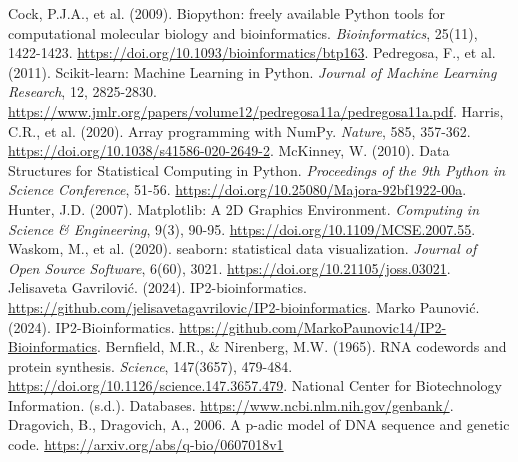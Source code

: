 \documentclass[a4paper,12pt]{article}
\begin{document}
\newpage
{}
\renewcommand{\refname}{Reference}
\begin{thebibliography}{9}
     Cock, P.J.A., et al. (2009). Biopython: freely available Python tools for computational molecular biology and bioinformatics. \textit{Bioinformatics}, 25(11), 1422-1423. \url{https://doi.org/10.1093/bioinformatics/btp163}.
     Pedregosa, F., et al. (2011). Scikit-learn: Machine Learning in Python. \textit{Journal of Machine Learning Research}, 12, 2825-2830. \url{https://www.jmlr.org/papers/volume12/pedregosa11a/pedregosa11a.pdf}.
     Harris, C.R., et al. (2020). Array programming with NumPy. \textit{Nature}, 585, 357-362. \url{https://doi.org/10.1038/s41586-020-2649-2}.
     McKinney, W. (2010). Data Structures for Statistical Computing in Python. \textit{Proceedings of the 9th Python in Science Conference}, 51-56. \url{https://doi.org/10.25080/Majora-92bf1922-00a}.
     Hunter, J.D. (2007). Matplotlib: A 2D Graphics Environment. \textit{Computing in Science \& Engineering}, 9(3), 90-95. \url{https://doi.org/10.1109/MCSE.2007.55}.
     Waskom, M., et al. (2020). seaborn: statistical data visualization. \textit{Journal of Open Source Software}, 6(60), 3021. \url{https://doi.org/10.21105/joss.03021}.
     Jelisaveta Gavrilović. (2024). IP2-bioinformatics. \url{https://github.com/jelisavetagavrilovic/IP2-bioinformatics}.  
     Marko Paunović. (2024). IP2-Bioinformatics. \url{https://github.com/MarkoPaunovic14/IP2-Bioinformatics}.
     Bernfield, M.R., \& Nirenberg, M.W. (1965). RNA codewords and protein synthesis. \textit{Science}, 147(3657), 479-484. \url{https://doi.org/10.1126/science.147.3657.479}.
     National Center for Biotechnology Information. (s.d.). Databases. \url{https://www.ncbi.nlm.nih.gov/genbank/}.
     Dragovich, B., Dragovich, A., 2006. A p-adic model of DNA sequence and genetic code. \url{https://arxiv.org/abs/q-bio/0607018v1}

\end{thebibliography}
\end{document}
